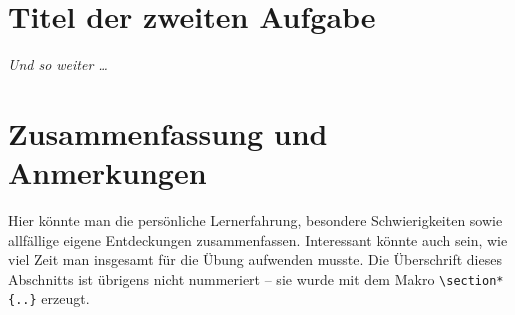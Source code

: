 \documentclass[notitlepage,german]{report}
\begin{document}

\section{Titel der zweiten Aufgabe}

\emph{Und so weiter \ldots}


\section*{Zusammenfassung und Anmerkungen}

Hier könnte man die persönliche Lernerfahrung, besondere Schwierigkeiten
sowie allfällige eigene Entdeckungen zusammenfassen.
Interessant könnte auch sein, wie viel Zeit man insgesamt 
für die Übung aufwenden musste.
Die Überschrift dieses Abschnitts ist übrigens nicht nummeriert --
sie wurde mit dem Makro \verb!\section*{..}! erzeugt.
 
  

\end{document}
